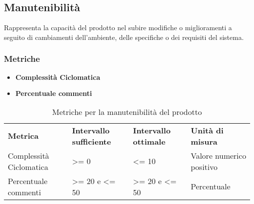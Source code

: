 \subsection{Manutenibilità}
Rappresenta la capacità del prodotto nel subire modifiche o miglioramenti a seguito di cambiamenti dell'ambiente, delle specifiche o dei requisiti del sistema.
\subsubsection{Metriche}
\begin{itemize}
	\item \textbf{Complessità Ciclomatica}
	\item \textbf{Percentuale commenti}
\end{itemize}

\renewcommand{\arraystretch}{2.2}
\begin{longtable}{|C{3cm}|C{3cm}|C{3cm}|C{3cm}|}

	\caption{Metriche per la manutenibilità del prodotto}\\
	\hline

	\textbf{Metrica} & \textbf{Intervallo sufficiente}  & \textbf{Intervallo ottimale} & \textbf{Unità di misura}
	\tabularnewline
	\endfirsthead

	Complessità Ciclomatica &  >= 0 & <= 10 & Valore numerico positivo \\
	Percentuale commenti &  >= 20 e <= 50 & >= 20 e <= 50 & Percentuale \\
\end{longtable}
